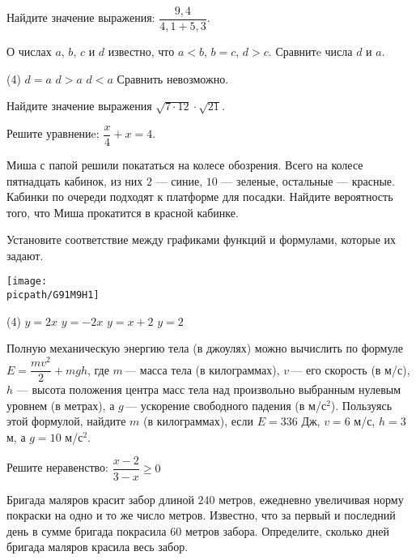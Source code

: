 \begin{homework}[number=1]
	\begin{listofex}
		\item Найдите значение выражения: \(\dfrac{9,4}{4,1+5,3}\).
		\item О числах \( a \), \( b\), \( c \) и \( d \) известно, что \( a<b \), \( b=c \), \( d>c \). Сравнитe числа \( d \) и \( a \).
		\begin{tasks}(4)
			\task \( d=a \)
			\task \( d>a \)
			\task \( d<a \)
			\task Сравнить невозможно.
		\end{tasks}
		\item Найдите значение выражения \( \sqrt{7\cdot12}\cdot\sqrt{21} \).
		\item Решите уравнениe: \(\dfrac{x}{4}+x=4\).
		\item Миша с папой решили покататься на колесе обозрения. Всего на колесе пятнадцать кабинок, из них \( 2 \) --- синие, \( 10 \) --- зеленые, остальные  --- красные. Кабинки по очереди подходят к платформе для посадки. Найдите вероятность того, что Миша прокатится в красной кабинке.
		\item Установите соответствие между графиками функций и формулами, которые их задают.
		\begin{center}
			\texttt{[image: \\picpath/G91M9H1]}
		\end{center}
		\begin{tasks}(4)
			\task \( y=2x \)
			\task \( y=-2x \)
			\task \( y=x+2 \)
			\task \( y=2 \)
		\end{tasks}
		\item Полную механическую энергию тела (в джоулях) можно вычислить по формуле \( E=\dfrac{mv^2}{2}+mgh \),  где \( m \) --- масса тела (в килограммах), \( v \) --- его скорость (в м/с), \( h \) --- высота положения центра масс тела над произвольно выбранным нулевым уровнем (в метрах), а \( g \) --- ускорение свободного падения (в м/с\( ^2 \)). Пользуясь этой формулой, найдите \( m \) (в килограммах), если \( E=336 \) Дж,  \( v=6 \) м/с, \( h=3 \) м, а \( g=10 \) м/с\( ^2 \). 
		\item Решите неравенство: \( \dfrac{x-2}{3-x}\ge0 \)
		\item Бригада маляров красит забор длиной \( 240 \) метров, ежедневно увеличивая норму покраски на одно и то же число метров. Известно, что за первый и последний день в сумме бригада покрасила \( 60 \) метров забора. Определите, сколько дней бригада маляров красила весь забор.

\end{listofex}
\end{homework}
